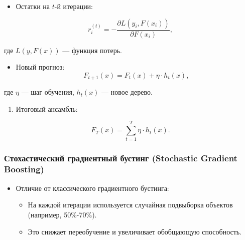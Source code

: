\begin{enumerate}
\begin{enumerate}
  \begin{itemize}
  \tightlist
  \item
    Остатки на \(t\)-й итерации:
  \end{itemize}
\end{enumerate}

\begin{equation}
     r_i^{(t)} = -\frac{\partial L(y_i, F(x_i))}{\partial F(x_i)},
\end{equation}


 где \(L(y, F(x))\) — функция потерь.


\begin{itemize}
\tightlist
\item
  Новый прогноз: \begin{equation}
  F_{t+1}(x) = F_t(x) + \eta \cdot h_t(x),
  \end{equation}
\end{itemize}

где \(\eta\) --- шаг обучения, \(h_t(x)\) --- новое дерево.

\begin{enumerate}
\def\labelenumi{\arabic{enumi}.}
\setcounter{enumi}{2}
\tightlist
\item
  Итоговый ансамбль:
\end{enumerate}

\begin{equation}
   F_T(x) = \sum_{t=1}^T \eta \cdot h_t(x).
\end{equation}

\hypertarget{ux441ux442ux43eux445ux430ux441ux442ux438ux447ux435ux441ux43aux438ux439-ux433ux440ux430ux434ux438ux435ux43dux442ux43dux44bux439-ux431ux443ux441ux442ux438ux43dux433-stochastic-gradient-boosting}{%
\subsubsection*{Стохастический градиентный бустинг (Stochastic Gradient
Boosting)}\label{ux441ux442ux43eux445ux430ux441ux442ux438ux447ux435ux441ux43aux438ux439-ux433ux440ux430ux434ux438ux435ux43dux442ux43dux44bux439-ux431ux443ux441ux442ux438ux43dux433-stochastic-gradient-boosting}}

\begin{itemize}
\tightlist
\item
  Отличие от классического градиентного бустинга:

  \begin{itemize}
  \tightlist
  \item
    На каждой итерации используется случайная подвыборка объектов
    (например, 50\%-70\%).
  \item
    Это снижает переобучение и увеличивает обобщающую способность.
  \end{itemize}
\end{itemize}


\end{enumerate}
